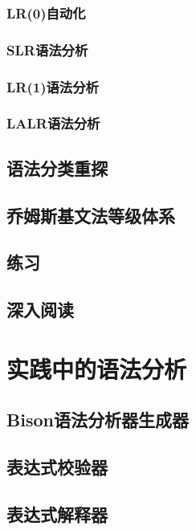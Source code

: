 \documentclass[cn,11pt,chinese]{elegantbook}
\begin{document}
\subsection{LR(0)自动化}

\subsection{SLR语法分析}

\subsection{LR(1)语法分析}

\subsection{LALR语法分析}

\section{语法分类重探}

\section{乔姆斯基文法等级体系}

\section{练习}

\section{深入阅读}

\chapter{实践中的语法分析}

\section{Bison语法分析器生成器}

\section{表达式校验器}

\section{表达式解释器}
\end{document}
